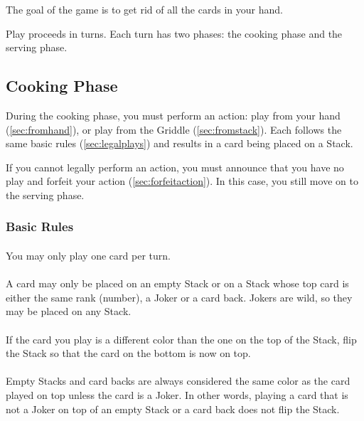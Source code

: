 \documentclass{article}
\begin{document}
The goal of the game is to get rid of all the cards in your hand.

Play proceeds in turns. Each turn has two phases: the cooking phase and the serving phase.

\subsection{Cooking Phase \label{sec:cookingphase}}

During the cooking phase, you must perform an action: play from your hand (\autoref{sec:fromhand}), or play from the Griddle (\autoref{sec:fromstack}). Each follows the same basic rules (\autoref{sec:legalplays}) and results in a card being placed on a Stack.

If you cannot legally perform an action, you must announce that you have no play and forfeit your action (\autoref{sec:forfeitaction}). In this case, you still move on to the serving phase.

\subsubsection{Basic Rules \label{sec:legalplays}}

\paragraph{\label{par:onecard}}
You may only play one card per turn.

\paragraph{\label{par:basicplay}}
A card may only be placed on an empty Stack or on a Stack whose top card is either the same rank (number), a Joker or a card back.
Jokers are wild, so they may be placed on any Stack.

\paragraph{\label{par:flip}}
If the card you play is a different color than the one on the top of the Stack, flip the Stack so that the card on the bottom is now on top.

\paragraph{\label{par:empty}}
Empty Stacks and card backs are always considered the same color as the card played on top unless the card is a Joker.
In other words, playing a card that is not a Joker on top of an empty Stack or a card back does not flip the Stack.
\end{document}
